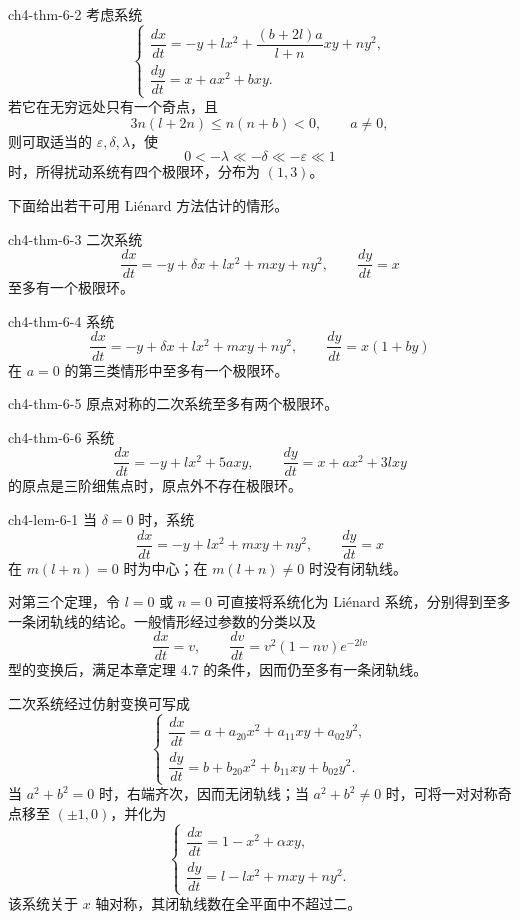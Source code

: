 \begin{theorem}{}{ch4-thm-6-2}
考虑系统
\[
\begin{cases}
\dfrac{dx}{dt}=-y+lx^2+\dfrac{(b+2l)a}{l+n}xy+ny^2,\\
\dfrac{dy}{dt}=x+ax^2+bxy.
\end{cases}
\]
若它在无穷远处只有一个奇点，且
\[
3n(l+2n)\leqslant n(n+b)<0,\qquad a\ne0,
\]
则可取适当的 \(\varepsilon,\delta,\lambda\)，使
\[
0<-\lambda\ll-\delta\ll-\varepsilon\ll1
\]
时，所得扰动系统有四个极限环，分布为 \((1,3)\)。
\end{theorem}

下面给出若干可用 Liénard 方法估计的情形。
\begin{theorem}{}{ch4-thm-6-3}
二次系统
\[
\dfrac{dx}{dt}=-y+\delta x+lx^2+mxy+ny^2,\qquad
\dfrac{dy}{dt}=x
\]
至多有一个极限环。
\end{theorem}

\begin{theorem}{}{ch4-thm-6-4}
系统
\[
\dfrac{dx}{dt}=-y+\delta x+lx^2+mxy+ny^2,\qquad
\dfrac{dy}{dt}=x(1+by)
\]
在 \(a=0\) 的第三类情形中至多有一个极限环。
\end{theorem}

\begin{theorem}{}{ch4-thm-6-5}
原点对称的二次系统至多有两个极限环。
\end{theorem}

\begin{theorem}{}{ch4-thm-6-6}
系统
\[
\dfrac{dx}{dt}=-y+lx^2+5axy,\qquad
\dfrac{dy}{dt}=x+ax^2+3lxy
\]
的原点是三阶细焦点时，原点外不存在极限环。
\end{theorem}

\begin{lemma}{}{ch4-lem-6-1}
当 \(\delta=0\) 时，系统
\[
\dfrac{dx}{dt}=-y+lx^2+mxy+ny^2,\qquad \dfrac{dy}{dt}=x
\]
在 \(m(l+n)=0\) 时为中心；在 \(m(l+n)\ne0\) 时没有闭轨线。
\end{lemma}

对第三个定理，令 \(l=0\) 或 \(n=0\) 可直接将系统化为 Liénard 系统，分别得到至多一条闭轨线的结论。一般情形经过参数的分类以及
\[
\dfrac{dx}{dt}=v,\qquad
\dfrac{dv}{dt}=v^2(1-nv)e^{-2lv}
\]
型的变换后，满足本章定理 4.7 的条件，因而仍至多有一条闭轨线。

二次系统经过仿射变换可写成
\begin{equation}
\begin{cases}
\dfrac{dx}{dt}=a+a_{20}x^2+a_{11}xy+a_{02}y^2,\\
\dfrac{dy}{dt}=b+b_{20}x^2+b_{11}xy+b_{02}y^2.
\end{cases}\tag{6.6}
\end{equation}
当 \(a^2+b^2=0\) 时，右端齐次，因而无闭轨线；当 \(a^2+b^2\ne0\) 时，可将一对对称奇点移至 \((\pm1,0)\)，并化为
\begin{equation}
\begin{cases}
\dfrac{dx}{dt}=1-x^2+\alpha xy,\\
\dfrac{dy}{dt}=l-lx^2+mxy+ny^2.
\end{cases}\tag{6.7}
\end{equation}
该系统关于 \(x\) 轴对称，其闭轨线数在全平面中不超过二。

